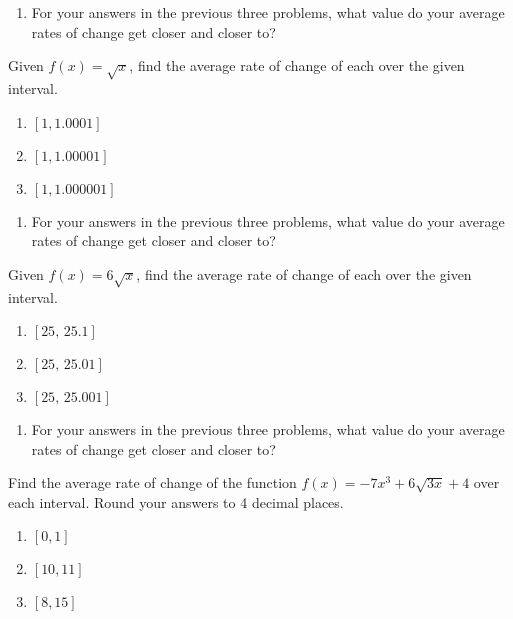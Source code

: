 \begin{enumerate}
\setcounter{enumi}{\value{Review}}
\item For your answers in the previous three problems, what value do your average rates of change get closer and closer to?
\setcounter{Review}{\value{enumi}}
\end{enumerate}

Given $f(x) = \sqrt{x}$, find the average rate of change of each over the given interval.
\begin{enumerate}
\setcounter{enumi}{\value{Review}}
	\item $[1, 1.0001]$
	\item $[1, 1.00001]$
	\item $[1, 1.000001]$
\setcounter{Review}{\value{enumi}}
\end{enumerate}

\begin{enumerate}
\setcounter{enumi}{\value{Review}}
\item For your answers in the previous three problems, what value do your average rates of change get closer and closer to?
\setcounter{Review}{\value{enumi}}
\end{enumerate}


Given $f(x) = 6\sqrt{x}$, find the average rate of change of each over the given interval.
\begin{enumerate}
\setcounter{enumi}{\value{Review}}
	\item $[25,\, 25.1]$
	\item $[25, \, 25.01]$
	\item $[25, \, 25.001]$
\setcounter{Review}{\value{enumi}}
\end{enumerate}

\begin{enumerate}
\setcounter{enumi}{\value{Review}}
\item For your answers in the previous three problems, what value do your average rates of change get closer and closer to?
\setcounter{Review}{\value{enumi}}
\end{enumerate}

Find the average rate of change of the function $f(x) = -7x^3 + 6\sqrt{3x} + 4$ over each interval. Round your answers to 4 decimal places.
\begin{enumerate}	\setcounter{enumi}{\value{Review}}
	\item $[0,1]$
	\item $[10,11]$
	\item $[8,15]$
\end{enumerate}	\setcounter{Review}{\value{enumi}}

